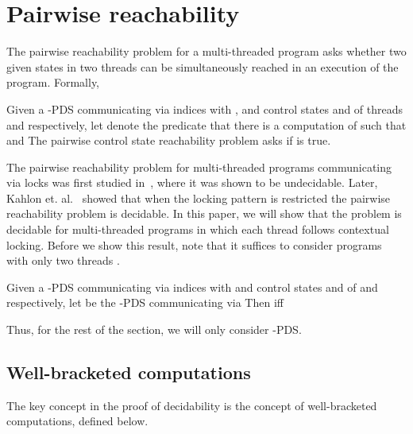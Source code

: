 \documentclass{LMCS}
\begin{document}
\section{Pairwise reachability}
\label{sec:main}
The pairwise reachability problem for a multi-threaded program
asks whether two given states in two threads can be simultaneously
reached in an execution of the program. Formally,

\begin{definition}
Given a -PDS  communicating via    indices  with , and control states  and
 of threads  and  respectively, let  denote the predicate that there is a computation  of  such that  and  The
pairwise control state reachability problem  asks if   is true.
\end{definition}

The pairwise reachability problem for multi-threaded programs
communicating via locks was first studied in~\cite{ram00}, where it
was shown to be undecidable. Later, Kahlon et. al.~\cite{kig05} showed
that when the locking pattern is restricted the pairwise reachability
problem is decidable.  In this paper, we will show that the problem is
decidable for multi-threaded programs in which each thread follows
contextual locking. Before we show this result, note that it suffices
to consider programs with only two threads \cite{kig05}.
\begin{proposition}
Given a -PDS  communicating via
 indices  with  and control states
 and  of  and  respectively, let 
be the -PDS  communicating via  Then  iff

\end{proposition}
Thus, for the rest of the section, we will only consider -PDS.

\subsection{Well-bracketed computations}
The key concept in the proof of decidability is
the concept of well-bracketed computations, defined below.
\end{document}
